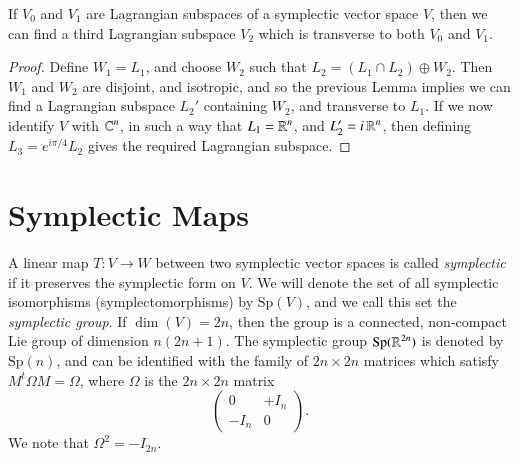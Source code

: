 \begin{lemma}
    If $V_0$ and $V_1$ are Lagrangian subspaces of a symplectic vector space $V$, then we can find a third Lagrangian subspace $V_2$ which is transverse to both $V_0$ and $V_1$.
\end{lemma}
\begin{proof}
    Define $W_1 = L_1$, and choose $W_2$ such that $L_2 = (L_1 \cap L_2) \oplus W_2$. Then $W_1$ and $W_2$ are disjoint, and isotropic, and so the previous Lemma implies we can find a Lagrangian subspace $L_2'$ containing $W_2$, and transverse to $L_1$. If we now identify $V$ with $\operatorname{\mathbb{C}}^n$, in such a way that $L_1 = \operatorname{\mathbb{R}}^n$, and $L_2' = i \operatorname{\mathbb{R}}^n$, then defining $L_3 = e^{i \pi / 4} L_2$ gives the required Lagrangian subspace.
\end{proof}

\section{Symplectic Maps}

A linear map $T: V \to W$ between two symplectic vector spaces is called \emph{symplectic} if it preserves the symplectic form on $V$. We will denote the set of all symplectic isomorphisms (symplectomorphisms) by $\text{Sp}(V)$, and we call this set the \emph{symplectic group}. If $\dim(V) = 2n$, then the group is a connected, non-compact Lie group of dimension $n(2n+1)$. The symplectic group $\text{Sp}(\operatorname{\mathbb{R}}^{2n})$ is denoted by $\text{Sp}(n)$, and can be identified with the family of $2n \times 2n$ matrices which satisfy $M^t \Omega M = \Omega$, where $\Omega$ is the $2n \times 2n$ matrix
%
\[ \begin{pmatrix} 0 & +I_n \\ -I_n & 0 \end{pmatrix}. \]
%
We note that $\Omega^2 = - I_{2n}$.

